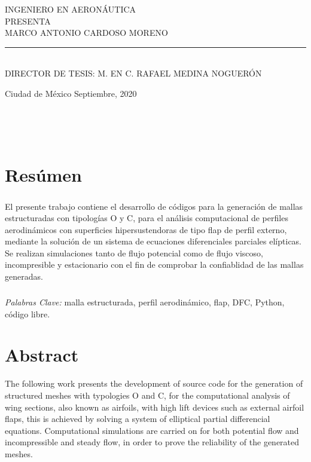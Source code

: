\documentclass[letterpaper, openright, 12pt]{book}
\begin{document}
\begin{titlepage}
\begin{center}
        \vspace{3mm}
        INGENIERO EN AERONÁUTICA\\
        \vspace{12mm}
        PRESENTA\\
        \vspace{3mm}
        MARCO ANTONIO CARDOSO MORENO\\
        \vspace{2mm}
        \rule{\textwidth}{1.5pt}\\
        \vspace{3mm}
        DIRECTOR DE TESIS: M. {\scriptsize EN} C. RAFAEL MEDINA NOGUERÓN
        \end{center}
    \vspace{20mm}
    Ciudad de México \hfill Septiembre, 2020
    \end{titlepage}

    \newpage\
    \thispagestyle{empty}

    \newpage
    \ %

    \chapter*{Resúmen}
    \paragraph*{}
    El presente trabajo contiene el desarrollo de códigos para la generación de
    mallas estructuradas con tipologías O y C, para el análisis computacional
    de perfiles aerodinámicos con superficies hipersustendoras de tipo flap de
    perfil externo, mediante la solución de un sistema de ecuaciones
    diferenciales parciales elípticas. Se realizan simulaciones tanto de flujo
    potencial como de flujo viscoso, incompresible y estacionario con el fin de
    comprobar la confiablidad de las mallas generadas.

    \paragraph*{}
    \emph{Palabras Clave:} malla estructurada, perfil aerodinámico, flap, DFC,
    Python, código libre.



    \chapter*{Abstract}
    The following work presents the development of source code for the
    generation of structured meshes with typologies O and C, for the
    computational analysis of wing sections, also known as airfoils, with high
    lift devices such as external airfoil flaps, this is achieved by solving a
    system of elliptical partial differencial equations. Computational
    simulations are carried on for both potential flow and incompressible and
    steady flow, in order to prove the reliability of the generated meshes.
\end{document}
